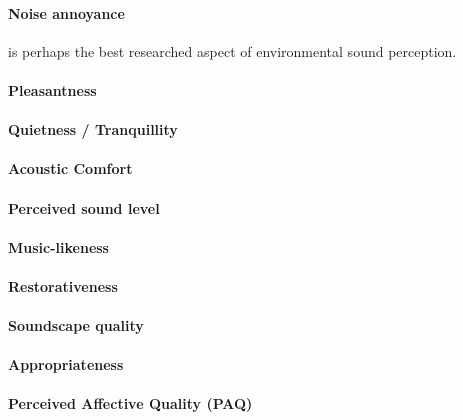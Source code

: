 \paragraph{Noise annoyance} is perhaps the best researched aspect of environmental sound perception.

\paragraph{Pleasantness}

\paragraph{Quietness / Tranquillity}

\paragraph{Acoustic Comfort}

\paragraph{Perceived sound level}

\paragraph{Music-likeness}

\paragraph{Restorativeness}

\paragraph{Soundscape quality}

\paragraph{Appropriateness}

\paragraph{Perceived Affective Quality (PAQ)}

